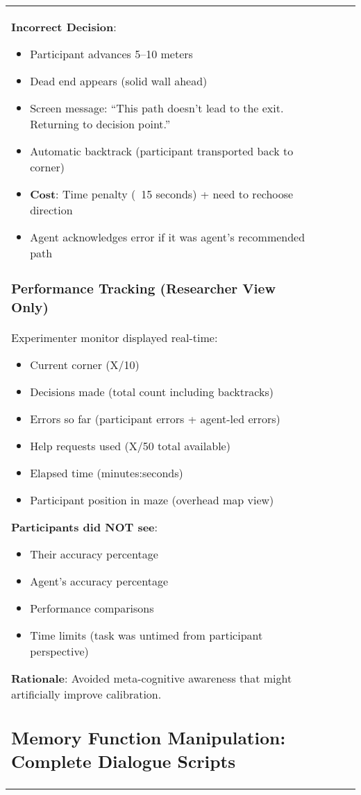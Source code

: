 \documentclass[12pt]{article}
\begin{document}
\begin{longtable}{p{}p{}p{}p{}p{}}
\textbf{Incorrect Decision}:
\begin{itemize}
    \item Participant advances 5--10 meters
    \item Dead end appears (solid wall ahead)
    \item Screen message: ``This path doesn't lead to the exit. Returning to decision point.''
    \item Automatic backtrack (participant transported back to corner)
    \item \textbf{Cost}: Time penalty (~15 seconds) + need to rechoose direction
    \item Agent acknowledges error if it was agent's recommended path
\end{itemize}

\subsubsection{Performance Tracking (Researcher View Only)}

Experimenter monitor displayed real-time:
\begin{itemize}
    \item Current corner (X/10)
    \item Decisions made (total count including backtracks)
    \item Errors so far (participant errors + agent-led errors)
    \item Help requests used (X/50 total available)
    \item Elapsed time (minutes:seconds)
    \item Participant position in maze (overhead map view)
\end{itemize}

\textbf{Participants did NOT see}:
\begin{itemize}
    \item Their accuracy percentage
    \item Agent's accuracy percentage  
    \item Performance comparisons
    \item Time limits (task was untimed from participant perspective)
\end{itemize}

\textbf{Rationale}: Avoided meta-cognitive awareness that might artificially improve calibration.

\subsection{Memory Function Manipulation: Complete Dialogue Scripts}


\end{longtable}
\end{document}
